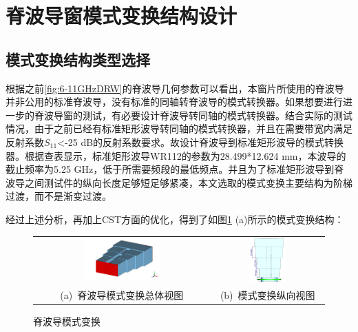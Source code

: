 \documentclass[master]{thesis-uestc}
\begin{document}
\section{脊波导窗模式变换结构设计}
\subsection{模式变换结构类型选择}
根据之前\ref{fig:6-11GHzDRW}的脊波导几何参数可以看出，本窗片所使用的脊波导并非公用的标准脊波导，没有标准的同轴转脊波导的模式转换器。如果想要进行进一步的脊波导窗的测试，有必要设计脊波导转同轴的模式转换器。结合实际的测试情况，由于之前已经有标准矩形波导转同轴的模式转换器，并且在需要带宽内满足反射系数$S_{11}$<-25 dB的反射系数要求。故设计脊波导到标准矩形波导的模式转换器。根据查表显示，标准矩形波导WR112的参数为28.499*12.624 mm，本波导的截止频率为5.25 GHz，低于所需要频段的最低频点。并且为了标准矩形波导到脊波导之间测试件的纵向长度足够短足够紧凑，本文选取的模式变换主要结构为阶梯过渡，而不是渐变过渡。

经过上述分析，再加上CST方面的优化，得到了如图\ref{fig:脊波导模式变换} (a)所示的模式变换结构：

\begin{figure}[!htb]
    \small
    \centering
    \begin{tabular}{@{\ }c@{\ }c}
        \includegraphics[width=0.45\textwidth]{pic/chapter3/脊波导模式变换.png} & 
        \hspace{5pt}
        \includegraphics[width=0.35\textwidth]{pic/chapter3/模式变换纵向长度.png}     \\
        \mbox{\small (a) 脊波导模式变换总体视图}                                                                               & 
        \mbox{\small (b) 模式变换纵向视图}                                                                                  \\
    \end{tabular}
    \caption{脊波导模式变换}
    \label{fig:脊波导模式变换}
\end{figure}
\end{document}
